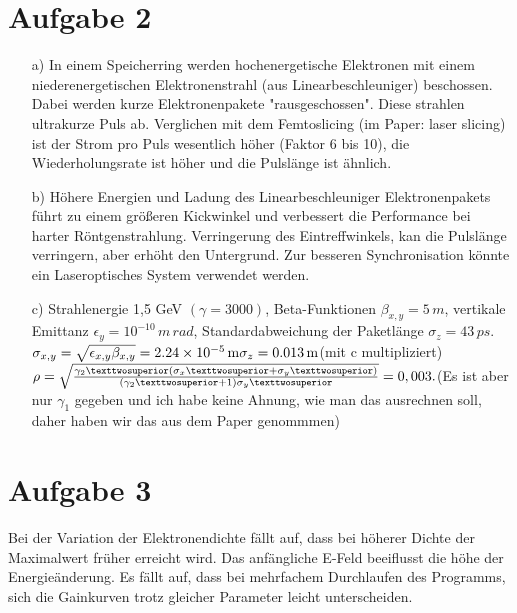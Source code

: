 \documentclass[11pt,a4paper]{article}
\begin{document}
    \section*{Aufgabe 2}
	\begin{itemize}
		\item[a)] 
			In einem Speicherring werden hochenergetische Elektronen mit einem niederenergetischen Elektronenstrahl (aus Linearbeschleuniger) beschossen.
			Dabei werden kurze Elektronenpakete "rausgeschossen".
			Diese strahlen ultrakurze Puls ab.
			Verglichen mit dem Femtoslicing (im Paper: laser slicing) ist der Strom pro Puls wesentlich höher (Faktor 6 bis 10),
			die Wiederholungsrate ist höher und die Pulslänge ist ähnlich.
			
		\item[b)]
			Höhere Energien und Ladung des Linearbeschleuniger Elektronenpakets führt zu einem größeren Kickwinkel 
			und verbessert die Performance bei harter Röntgenstrahlung.
			Verringerung des Eintreffwinkels, kan die Pulslänge verringern, aber erhöht den Untergrund.
			Zur besseren Synchronisation könnte ein Laseroptisches System verwendet werden.

		\item[c)]
			Strahlenergie 1,5 GeV $(\gamma  = 3000)$, Beta-Funktionen $\beta_{x,y}
			= 5\,m$, vertikale Emittanz $\epsilon_y = 10^{-10}\,m\,rad$, Standardabweichung der Paketlänge $\sigma_z = 43\,ps$. \\
			$\sigma_{x,y} = \sqrt{\epsilon_{x,y} \beta_ {x,y}} = \SI{2.24e-5}{\meter}\\
			\sigma_{z} = \SI{0.013}{\meter} $(mit c multipliziert)$\\
			\rho = \sqrt{\frac{\gamma_2 ² (\sigma_x² + \sigma_y²)}{(\gamma_2²+1)\sigma_y²}} = 0,003.\\
			$(Es ist aber nur $\gamma_{1}$ gegeben und ich habe keine Ahnung, wie man das ausrechnen soll, daher haben wir das aus dem Paper genommmen)
	\end{itemize}

	\section*{Aufgabe 3}
		Bei der Variation der Elektronendichte fällt auf, 
		dass bei höherer Dichte der Maximalwert früher erreicht wird.
		Das anfängliche E-Feld beeiflusst die höhe der Energieänderung.
		Es fällt auf, dass bei mehrfachem Durchlaufen des Programms, sich die Gainkurven trotz gleicher Parameter leicht unterscheiden.
\end{document}
